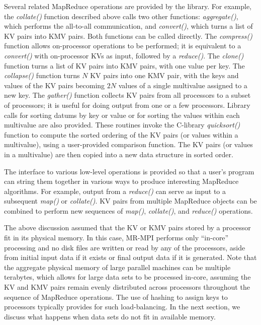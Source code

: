 Several related MapReduce operations are provided by the library.  For
example, the {\it collate()} function described above calls two other
functions: {\it aggregate()}, which performs the all-to-all
communication, and {\it convert()}, which turns a list of KV pairs
into KMV pairs.  Both functions can be called directly.  The {\it
compress()} function allows on-processor operations to be performed;
it is equivalent to a {\it convert()} with on-processor KVs as input,
followed by a {\it reduce()}.  The {\it clone()} function turns a list
of KV pairs into KMV pairs, with one value per key.  The {\it
collapse()} function turns $N$ KV pairs into one KMV pair, with the
keys and values of the KV pairs becoming $2N$ values of a single
multivalue assigned to a new key.  The {\it gather()} function
collects KV pairs from all processors to a subset of processors; it is
useful for doing output from one or a few processors.  Library calls
for sorting datums by key or value or for sorting the values within
each multivalue are also provided.  These routines invoke the
C-library {\it quicksort()} function to compute the sorted ordering of
the KV pairs (or values within a multivalue), using a user-provided
comparison function.  The KV pairs (or values in a multivalue) are
then copied into a new data structure in sorted order.

The interface to various low-level operations is provided so
that a user's program can string them together in various ways to
produce interesting MapReduce algorithms.  For example, output from a
{\it reduce()} can serve as input to a subsequent {\it map()} or {\it
collate()}.  KV pairs from multiple MapReduce objects can be combined
to perform new sequences of {\it map()}, {\it collate()}, and
{\it reduce()} operations.

The above discussion assumed that the KV or KMV pairs stored by a
processor fit in its physical memory.  In this case, MR-MPI performs
only ``in-core'' processing and no disk files are written or read by
any of the processors, aside from initial input data if it exists or
final output data if it is generated.  Note that the aggregate
physical memory of large parallel machines can be multiple terabytes,
which allows for large data sets to be processed in-core, assuming the
KV and KMV pairs remain evenly distributed across processors
throughout the sequence of MapReduce operations.  The use of hashing
to assign keys to processors typically provides for such
load-balancing.  In the next section, we discuss what happens when
data sets do not fit in available memory.
